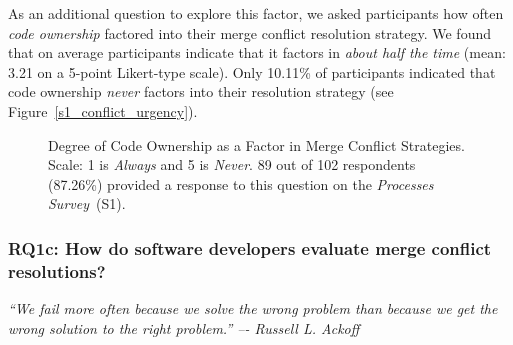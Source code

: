 As an additional question to explore this factor, we asked participants how often \textit{code ownership} factored into their merge conflict resolution strategy.
We found that on average participants indicate that it factors in \textit{about half the time} (mean: 3.21 on a 5-point Likert-type scale).
Only 10.11\% of participants indicated that code ownership \textit{never} factors into their resolution strategy (see Figure~\ref{s1_conflict_urgency}).

\begin{figure}[!htbp]
\centering
{}
\caption{Degree of Code Ownership as a Factor in Merge Conflict Strategies. Scale: 1 is \textit{Always} and 5 is \textit{Never}. 89 out of 102 respondents (87.26\%) provided a response to this question on the \textit{Processes Survey}~(S1).}
\label{model}
\end{figure}

\subsubsection{\textbf{RQ1c:} How do software developers evaluate merge conflict resolutions?}\label{RQ1c}
\vspace*{-0.5\baselineskip}
\begin{quoting}
\textit{``We fail more often because we solve the wrong problem than because we get the wrong solution to the right problem.'' –- Russell L. Ackoff}
\end{quoting}
\vspace*{+0.3\baselineskip}

